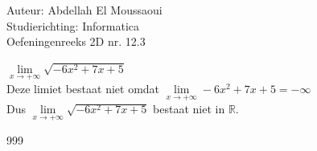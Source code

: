 \documentclass[a4paper]{article}
\begin{document}
  
\noindent \large Auteur: Abdellah El Moussaoui \\
\noindent \large Studierichting: Informatica\\
\noindent \large Oefeningenreeks 2D nr. 12.3\\

\medskip

\normalsize


$\lim\limits_{x\to+\infty}\sqrt{-6x^2+7x+5}$\\

Deze limiet bestaat niet omdat $\lim\limits_{x\to+\infty}-6x^2+7x+5 = -\infty$\\

Dus $\lim\limits_{x\to+\infty}\sqrt{-6x^2+7x+5}$ bestaat niet in $\mathbb{R}$.\\

\begin{thebibliography}{999}
\end{thebibliography}
\end{document}
